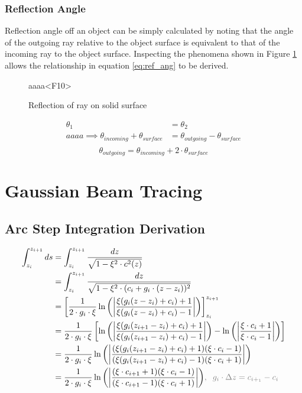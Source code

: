 \documentclass{article}
\begin{document}
\subsubsection{Reflection Angle}
Reflection angle off an object can be simply calculated by noting that the angle of the outgoing ray relative to the object surface is equivalent to that of the incoming ray to the object surface. Inspecting the phenomena shown in Figure \ref{fig:reflect_diagram} allows the relationship in equation \ref{eq:ref_ang} to be derived.
\begin{figure}[H]
  \centering
  
  \caption{Reflection of ray on solid surface}
  \label{fig:reflect_diagram}aaaa<F10>
\end{figure}
\begin{align*}
  \theta_1 &= \theta_2 \\aaaa
  \implies \theta_{incoming} + \theta_{surface} &= \theta_{outgoing} - \theta_{surface}\\   
\end{align*}
\begin{equation}
  \label{eq:ref_ang}
  \theta_{outgoing} = \theta_{incoming} + 2\cdot\theta_{surface}
\end{equation}

\section{Gaussian Beam Tracing}
\subsection{Arc Step Integration Derivation}
\begin{align*}
  \int_{z_i}^{z_{i+1}}ds &= \int_{z_i}^{z_{i+1}}\frac{dz}{\sqrt{1-\xi^2\cdot c^2(z)}} \\
  &= \int_{z_i}^{z_{i+1}}\frac{dz}{\sqrt{1-\xi^2\cdot (c_i + g_i\cdot(z - z_i))^2}} \\  
  &= \left[ \frac{1}{2\cdot g_i \cdot \xi}\ln{\left(\left| \frac{\xi(g_i(z-z_i)+c_i)+1}{\xi(g_i(z-z_i) + c_i)-1}\right|\right)} \right]_{z_i}^{z_{i+1}} \\
  &= \frac{1}{2\cdot g_i\cdot\xi}\left[ \ln{\left(\left| \frac{\xi(g_i(z_{i+1}-z_i)+c_i)+1}{\xi(g_i(z_{i+1}-z_i) + c_i)-1}\right|\right)} - \ln{\left(\left| \frac{\xi\cdot c_i+1}{\xi \cdot c_i-1}\right|\right)}\right]\\
  &= \frac{1}{2\cdot g_i\cdot\xi}\ln{\left(\left| \frac{(\xi(g_i(z_{i+1}-z_i)+c_i)+1)(\xi\cdot c_i -1)}{(\xi(g_i(z_{i+1}-z_i) + c_i)-1)(\xi\cdot c_i +1)}\right|\right)}\\
  &= \frac{1}{2\cdot g_i\cdot\xi}\ln{\left(\left| \frac{(\xi\cdot c_{i+1}+1)(\xi\cdot c_i -1)}{(\xi\cdot c_{i+1}-1)(\xi\cdot c_i +1)}\right|\right)}\textcolor{gray}{,\;\;g_{i}\cdot\Delta z=c_{i+_1}-c_i}
\end{align*}
\end{document}
